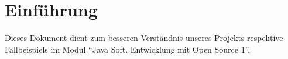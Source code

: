 \chapter{Einführung}
\label{chap:introduction}
Dieses Dokument dient zum besseren Verständnis unseres Projekts respektive Fallbeispiels im Modul \enquote{Java Soft. Entwicklung mit Open Source 1}. 

%
